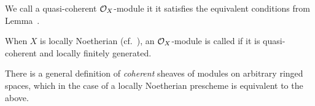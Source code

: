 \documentclass[a4paper,parskip=half,numbers=enddot, DIV=12]{scrreprt}
\begin{document}
\begin{defi}
	\begin{alphanumerate}
		\item {}We call a quasi-coherent $\mathcal{O}_X$-module  it it satisfies the equivalent conditions from Lemma~.
		\item When $X$ is locally Noetherian (cf.\ \cite[Definition~2.2.2]{alggeo1}), an $\mathcal{O}_X$-module is called  if it is quasi-coherent and locally finitely generated.
	\end{alphanumerate}
\end{defi}
\begin{rem*}
	There is a general definition of \emph{coherent} sheaves of modules on arbitrary ringed spaces, which in the case of a locally Noetherian prescheme is equivalent to the above.
\end{rem*}
\end{document}
